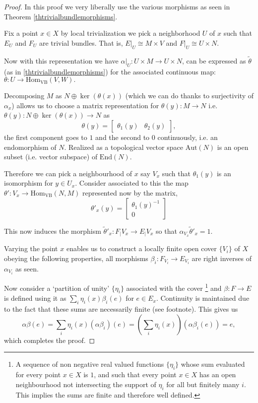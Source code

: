 \documentclass[12pt]{report}
\numberwithin{equation}{section}
\newcommand{\Hom}{{\mathrm{Hom}}}
\begin{document}
	\begin{proof}
		In this proof we very liberally use the various morphisms as seen in Theorem \ref{thtrivialbundlemorphisms}.
		
		Fix a point $x \in X$ by local trivialization we pick a neighborhood $U$ of $x$ such that $E_U$ and $F_U$ are trivial bundles. That is, $E|_U \cong M \times V$ and $F|_U \cong U \times N$.
		
		Now with this representation we have $\alpha|_U: U \times M \to U \times N$, can be expressed as $\tilde{\theta}$ (as in \ref{thtrivialbundlemorphisms}) for the associated continuous map:
		\(
		\theta: U \to \mathrm{Hom}_{\mathrm{VB}}(V, W).
		\)
		
		Decomposing $M$ as $N\oplus \ker (\theta (x))$ (which we can do thanks to surjectivity of $\alpha_x$) allows us to choose a matrix representation for $\theta(y):M\to N$ i.e. $\theta(y):N \oplus \ker (\theta( x)) \to N$ as
		\[
		\theta(y) = 
		\begin{bmatrix} 
			\theta_1(y) & \theta_2(y) 
		\end{bmatrix},
		\]
		the first component goes to \(1\) and the second to \( 0 \) continuously, i.e. an endomorphism of $N$. Realized as a topological vector space $\mathrm{Aut}(N)$ is an open subset (i.e. vector subspace) of $\mathrm{End}(N)$. 
		
		Therefore we can pick a neighbourhood of $x$ say $V_x$ such that $\theta_1(y)$ is an isomorphism for $y \in U_x$. Consider associated to this the map $\theta': V_x \to \Hom_{\mathrm{VB}}(N,M)$ represented now by the matrix,
		\[ \theta'_x(y)=\begin{bmatrix}
			\theta_1(y)^{-1}\\0
		\end{bmatrix} \]
		
		This now induces the morphism $\tilde{\theta}'_x: F_|{V_x} \to E_|{V_x}$ so that $\alpha_{V_x} \tilde{\theta}'_x = 1$. 
		
		Varying the point $x$ enables us to construct a locally finite open cover $\{V_i\}$ of $X$ obeying the following properties, all morphisms $\beta_i: F_{V_i} \to E_{V_i}$ are right inverses of $\alpha_{V_i}$ as seen.
		
		Now consider a `partition of unity' $\{ \eta_i\}$ associated with the cover \footnote{A sequence of non negative real valued functions $\{\eta_i \}$ whose sum evaluated for every point $x \in X$ is $1$, and such that every point $x\in X$ has an open neighbourhood not intersecting the support of $\eta_i $ for all but finitely many $i$. This implies the sums are finite and therefore well defined.} and $\beta:F \to E$ is defined using it as $\sum_{i} \eta_i(x)\beta_i(e)$ for $e\in E_x$. Continuity is maintained due to the fact that these sums are necessarily finite (see footnote). This gives us \[ \alpha \beta (e)= \sum_i \eta_i(x) (\alpha \beta_i) (e) = \left(\sum_i \eta_i(x)\right) (\alpha \beta_i (e)) = e, \]
		which completes the proof.
	\end{proof}
	
\end{document}
